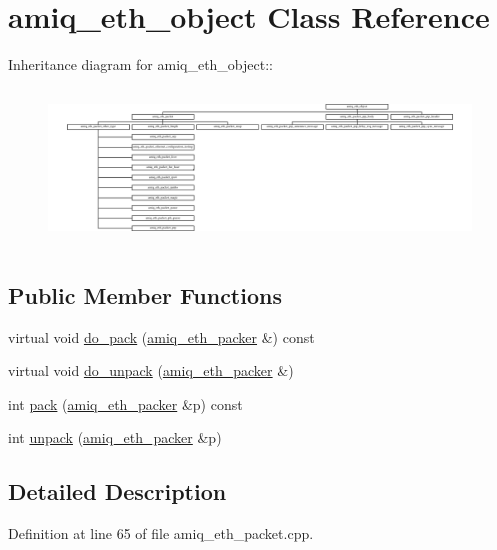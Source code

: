 \hypertarget{classamiq__eth__object}{
\section{amiq\_\-eth\_\-object Class Reference}
\label{classamiq__eth__object}
}
Inheritance diagram for amiq\_\-eth\_\-object::\begin{figure}[H]
\begin{center}
\leavevmode
\includegraphics[height=4.18391cm]{classamiq__eth__object}
\end{center}
\end{figure}
\subsection*{Public Member Functions}
\begin{DoxyCompactItemize}
\item 
virtual void \hyperlink{classamiq__eth__object_a1c8e3c7f04c5a75ccfdb5140f1559879}{do\_\-pack} (\hyperlink{classamiq__eth__packer}{amiq\_\-eth\_\-packer} \&) const 
\item 
virtual void \hyperlink{classamiq__eth__object_aaa82659e656422df7dcf2cce578fc7d7}{do\_\-unpack} (\hyperlink{classamiq__eth__packer}{amiq\_\-eth\_\-packer} \&)
\item 
int \hyperlink{classamiq__eth__object_a944b75035d82bb7753dabac0eedd1cc5}{pack} (\hyperlink{classamiq__eth__packer}{amiq\_\-eth\_\-packer} \&p) const 
\item 
int \hyperlink{classamiq__eth__object_a99591a67f736c581d67207129a344b46}{unpack} (\hyperlink{classamiq__eth__packer}{amiq\_\-eth\_\-packer} \&p)
\end{DoxyCompactItemize}


\subsection{Detailed Description}


Definition at line 65 of file amiq\_\-eth\_\-packet.cpp.

